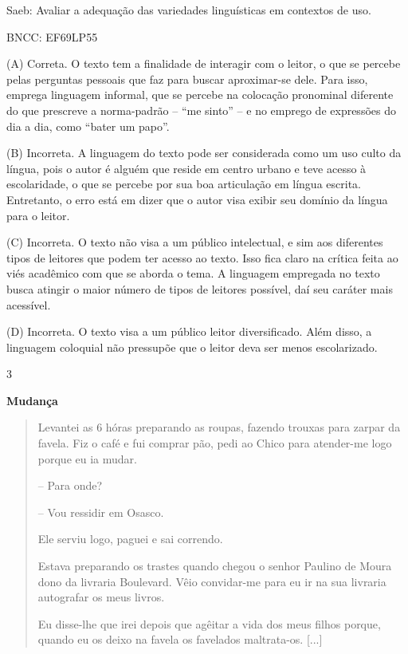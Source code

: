 Saeb: Avaliar a adequação das variedades linguísticas em contextos de
uso.

BNCC: EF69LP55

(A) Correta. O texto tem a finalidade de interagir com o leitor, o que
se percebe pelas perguntas pessoais que faz para buscar aproximar-se
dele. Para isso, emprega linguagem informal, que se percebe na colocação
pronominal diferente do que prescreve a norma-padrão -- ``me sinto'' --
e no emprego de expressões do dia a dia, como ``bater um papo''.

(B) Incorreta. A linguagem do texto pode ser considerada como um uso
culto da língua, pois o autor é alguém que reside em centro urbano e
teve acesso à escolaridade, o que se percebe por sua boa articulação em
língua escrita. Entretanto, o erro está em dizer que o autor visa exibir
seu domínio da língua para o leitor.

(C) Incorreta. O texto não visa a um público intelectual, e sim aos
diferentes tipos de leitores que podem ter acesso ao texto. Isso fica
claro na crítica feita ao viés acadêmico com que se aborda o tema. A
linguagem empregada no texto busca atingir o maior número de tipos de
leitores possível, daí seu caráter mais acessível.

(D) Incorreta. O texto visa a um público leitor diversificado. Além
disso, a linguagem coloquial não pressupõe que o leitor deva ser menos
escolarizado.

\num{3}

\textbf{Mudança}

\begin{quote}
Levantei as 6 hóras preparando as roupas, fazendo trouxas para zarpar da
favela. Fiz o café e fui comprar pão, pedi ao Chico para atender-me logo
porque eu ia mudar.

-- Para onde?

-- Vou ressidir em Osasco.

Ele serviu logo, paguei e sai correndo.

Estava preparando os trastes quando chegou o senhor Paulino de Moura
dono da livraria Boulevard. Vêio convidar-me para eu ir na sua livraria
autografar os meus livros.

Eu disse-lhe que irei depois que agêitar a vida dos meus filhos porque,
quando eu os deixo na favela os favelados maltrata-os. {[}...{]}
\end{quote}

